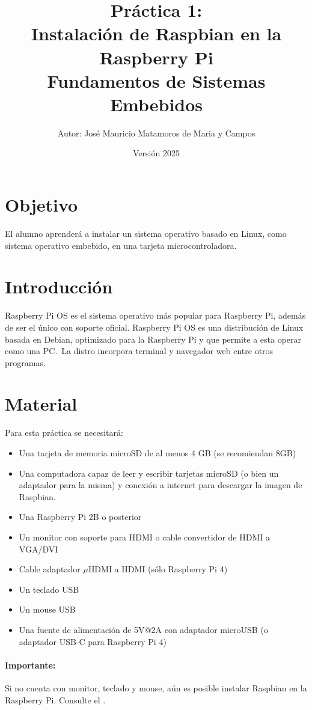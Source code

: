 \documentclass[letterpaper,10.5pt]{article}
\author{\footnotesize Autor: José Mauricio Matamoros de Maria y Campos}
\title{Práctica 1:\\Instalación de Raspbian en la Raspberry Pi\\
{\large Fundamentos de Sistemas Embebidos}}
\date{Versión 2025}
\begin{document}
\maketitle

\section{Objetivo}%
\label{sec:objective}
El alumno aprenderá a instalar un sistema operativo basado en Linux, como sistema operativo embebido, en una tarjeta microcontroladora.

\section{Introducción}%
\label{sec:introduction}
Raspberry Pi OS es el sistema operativo más popular para Raspberry Pi, además de ser el único con soporte oficial.
Raspberry Pi OS es una distribución de Linux basada en Debian, optimizado para la Raspberry Pi y que permite a esta operar como una PC.~La distro incorpora terminal y navegador web entre otros programas.


\section{Material}%
\label{sec:material}
Para esta práctica se necesitará:
\begin{itemize}[nosep]
	\item Una tarjeta de memoria microSD de al menos 4 GB (se recomiendan 8GB)
	\item Una computadora capaz de leer y escribir tarjetas microSD (o bien un adaptador para la misma) y conexión a internet para descargar la imagen de Raspbian.
	\item Una Raspberry Pi 2B o posterior
	\item Un monitor con soporte para HDMI o cable convertidor de HDMI a VGA/DVI
	\item Cable adaptador $\mu$HDMI a HDMI (sólo Raspberry Pi 4)
	\item Un teclado USB
	\item Un mouse USB
	\item Una fuente de alimentación de 5V@2A con adaptador microUSB (o adaptador USB-C para Raspberry Pi 4)
\end{itemize}

\paragraph*{Importante:} Si no cuenta con monitor, teclado y mouse, aún es posible instalar Raspbian en la Raspberry Pi. Consulte el .
\end{document}
